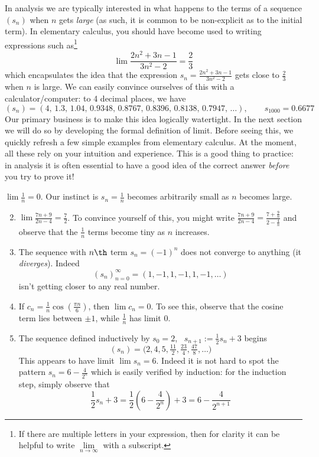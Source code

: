 In analysis we are typically interested in what happens to the terms of a sequence $(s_n)$ when $n$ gets \emph{large} (as such, it is common to be non-explicit as to the initial term). In elementary calculus, you should have become used to writing expressions such as\footnote{If there are multiple letters in your expression, then for clarity it can be helpful to write $\lim\limits_{n\to\infty}$ with a subscript.}
\[
	\lim\frac{2n^2+3n-1}{3n^2-2}=\frac 23
\]
which encapsulates the idea that the expression $s_n=\frac{2n^2+3n-1}{3n^2-2}$ gets close to $\frac 23$ when $n$ is large. We can easily convince ourselves of this with a calculator/computer: to 4 decimal places, we have
\[(s_n)=(4,\,1.3,\,1.04,\,
 0.9348,\,
 0.8767,\,
 0.8396,\,
 0.8138,\,
 0.7947,\,\ldots),\qquad s_{1000}=0.6677\]
Our primary business is to make this idea logically watertight. In the next section we will do so by developing the formal definition of limit. Before seeing this, we quickly refresh a few simple examples from elementary calculus. At the moment, all these rely on your intuition and experience. This is a good thing to practice: in analysis it is often essential to have a good idea of the correct answer \emph{before} you try to prove it!

\goodbreak

\begin{examples}{}{}
	\exstart $\lim \frac 1n=0$. Our instinct is $s_n=\frac 1n$ becomes arbitrarily small as $n$ becomes large. 
	\begin{enumerate}\setcounter{enumi}{1}
	  \item $\lim\frac{7n+9}{2n-4}=\frac 72$. To convince yourself of this, you might write $\frac{7n+9}{2n-4}=\frac{7+\frac 9n}{2-\frac 4n}$
	  and observe that the $\frac 1n$ terms become tiny as $n$ increases.
	  \item The sequence with $n\th$ term $s_n=(-1)^n$ does not converge to anything (it \emph{diverges}). Indeed
	  \[(s_n)_{n=0}^\infty=(1,-1,1,-1,1,-1,\ldots)\]
	  isn't getting closer to any real number.
	  \item If $c_n=\frac 1n\cos\left(\frac{\pi n}6\right)$, then $\lim c_n=0$. To see this, observe that the cosine term lies between $\pm 1$, while $\frac 1n$ has limit 0.
	  \item The sequence defined inductively by $s_0=2$, \ $s_{n+1}:=\frac 12s_n+3$ begins
	  \[(s_n)=\bigl(2,4,5,\tfrac{11}2,\tfrac{23}4,\tfrac{47}8,\ldots\bigr)\]
	  This appears to have limit $\lim s_n=6$. Indeed it is not hard to spot the pattern $s_n=6-\frac{4}{2^n}$ which is easily verified by induction: for the induction step, simply observe that
	  \[\frac 12s_n+3=\frac 12\left(6-\frac 4{2^n}\right) +3 =6-\frac 4{2^{n+1}}\]
	\end{enumerate}
\end{examples} 


